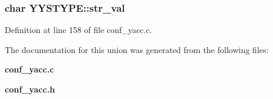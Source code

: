 \subsubsection[{str\_\-val}]{\setlength{\rightskip}{0pt plus 5cm}char {\bf YYSTYPE::str\_\-val}}\label{unionYYSTYPE_34e921f67f43dd8b6d493b186ca9b2d4}




Definition at line 158 of file conf\_\-yacc.c.

The documentation for this union was generated from the following files:\begin{CompactItemize}
\item 
{\bf conf\_\-yacc.c}\item 
{\bf conf\_\-yacc.h}\end{CompactItemize}
